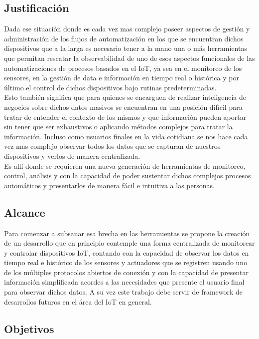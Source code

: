 \subsection{Justificación}
Dada ese situación donde es cada vez mas complejo poseer aspectos de gestión y administración de los flujos de automatización en los que se encuentran dichos dispositivos que a la larga es necesario tener a la mano una o más herramientas que permitan rescatar la observabilidad de uno de esos aspectos funcionales de las automatizaciones de procesos basados en el IoT, ya sea en el monitoreo de los sensores, en la gestión de data e información en tiempo real o histórica y por último el control de dichos dispositivos bajo rutinas predeterminadas.\\

Esto también significa que para quienes se encarguen de realizar inteligencia de negocios sobre dichos datos masivos se encuentran en una posición difícil para tratar de entender el contexto de los mismos y que información pueden aportar sin tener que ser exhaustivos o aplicando métodos complejos para tratar la información. Incluso como usuarios finales en la vida cotidiana se nos hace cada vez mas complejo observar todos los datos que se capturan de nuestros dispositivos y verlos de manera centralizada.\\

Es allí donde se requieren una nueva generación de herramientas de monitoreo, control, análisis  y con la capacidad de poder sustentar dichos complejos procesos automáticos y presentarlos de manera fácil e intuitiva a las personas.

\subsection{Alcance}
Para comenzar a subsanar esa brecha en las herramientas se propone la creación de un desarrollo que en principio contemple una forma centralizada de monitorear y controlar dispositivos IoT, contando con la capacidad de observar los datos en tiempo real e histórico de los sensores y actuadores que se registren usando uno de los múltiples protocolos abiertos de conexión y con la capacidad de presentar información simplificada acordes a las necesidades que presente el usuario final para observar dichos datos. A su vez este trabajo debe servir de framework de desarrollos futuros en el área del IoT en general.
 
\subsection{Objetivos}
